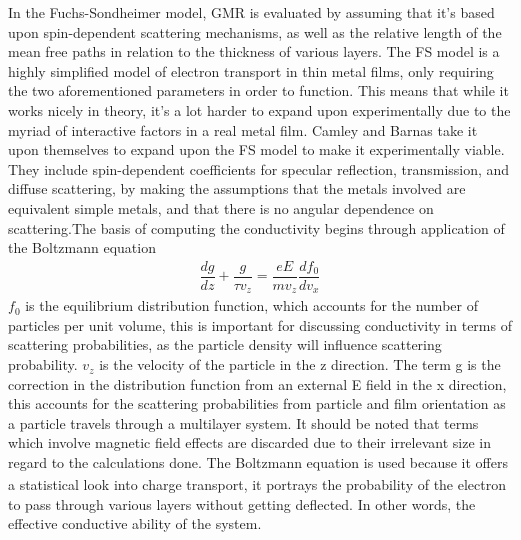 \documentclass[11pt]{article}
\begin{document}
\begin{multicols}{2}
In the Fuchs-Sondheimer model, GMR is evaluated by assuming that it's based upon spin-dependent scattering mechanisms, as well as the relative length of the mean free paths in relation to the thickness of various layers. The FS model is a highly simplified model of electron transport in thin metal films, only requiring the two aforementioned parameters in order to function. This means that while it works nicely in theory, it’s a lot harder to expand upon experimentally due to the myriad of interactive factors in a real metal film. Camley and Barnas take it upon themselves to expand upon the FS model to make it experimentally viable. They include spin-dependent coefficients for specular reflection, transmission, and diffuse scattering, by making the assumptions that the metals involved are equivalent simple metals, and that there is no angular dependence on scattering.The basis of computing the conductivity begins through application of the Boltzmann equation
\begin{align*}
\dfrac{dg}{dz}+ \dfrac{g}{\tau v_z} = \dfrac{eE}{m v_z} \dfrac{df_0}{dv_x}
\end{align*}
$f_0$ is the equilibrium distribution function, which accounts for the number of particles per unit volume, this is important for discussing conductivity in terms of scattering probabilities, as the particle density will influence scattering probability. $v_z$ is the velocity of the particle in the z direction.  The term g is the correction in the distribution function from an external E field in the x direction, this accounts for the scattering probabilities from particle and film orientation as a particle travels through a multilayer system. It should be noted that terms which involve magnetic field effects are discarded due to their irrelevant size in regard to the calculations done\textsubscript{\cite{label2}}. The Boltzmann equation is used because it offers a statistical look into charge transport, it portrays the probability of the electron to pass through various layers without getting deflected. In other words, the effective conductive ability of the system.


\end{multicols}
\end{document}
